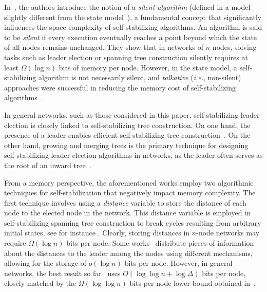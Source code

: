 \documentclass[a4paper, 12pt]{article}
\begin{document}
In~\cite{DGS99}, the authors introduce the notion of a \textit{silent algorithm} (defined in a model slightly different from the state model~\cite{D74}), a fundamental concept that significantly influences the space complexity of self-stabilizing algorithms.  An algorithm is said to be \textit{silent} if every execution eventually reaches a point beyond which the state of all nodes remains unchanged.
They show that in networks of $n$ nodes, solving tasks such as leader election or spanning tree construction silently requires at least $\Omega(\log n)$ bits of memory per node. 
However, in the state model, a self-stabilizing algorithm is not necessarily silent, and \textit{talkative} (\textit{i.e.}, non-silent) approaches were successful in reducing the memory cost of self-stabilizing algorithms~\cite{BT18,BT20}. 

In general networks, such as those considered in this paper, self-stabilizing leader election is closely linked to self-stabilizing tree construction. 
On one hand, the presence of a leader enables efficient self-stabilizing tree construction~\cite{BPR13,CYH91,CD94,DDJL23,DIM93,IL94,J97,KKM11}. 
On the other hand, growing and merging trees is the primary technique for designing self-stabilizing leader election algorithms in networks, as the leader often serves as the root of an inward tree~\cite{AB98,AKY90,AG94,BDPR10,BT18,BT20}.

From a memory perspective, the aforementioned works employ two algorithmic techniques for self-stabilization that negatively impact memory complexity.
%
The first technique involves using a \textit{distance} variable to store the distance of each node to the elected node in the network. This distance variable is employed in self-stabilizing spanning tree construction to break cycles resulting from arbitrary initial states, see for instance \cite{AB98,AKY90,AG94}.
Clearly, storing distances in $n$-node networks may require $\Omega(\log n)$ bits per node. Some works~\cite{AO94,BT18,BT20} distribute pieces of information about the distances to the leader among the nodes using different mechanisms, allowing for the storage of $o(\log n)$ bits per node. However, in general networks, the best result so far~\cite{BT20} uses $O(\log \log n + \log \Delta)$ bits per node, closely matched by the $\Omega(\log \log n)$ bits per node lower bound obtained in~\cite{BFB23}.
\end{document}
